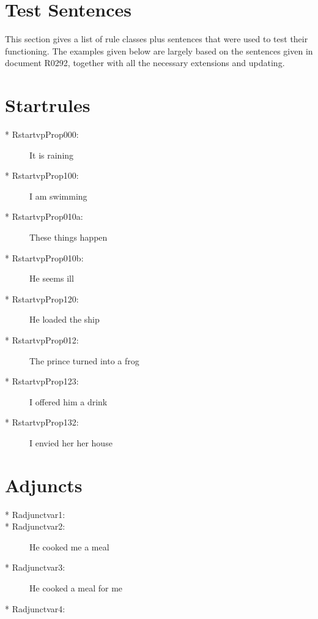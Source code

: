 \section {Test Sentences}
This section gives a list of rule classes plus sentences that were used to test 
their functioning. The examples given below are largely based on the sentences 
given in document R0292, together with all the necessary extensions and 
updating.


\section {Startrules}
\begin{description}
\item [* RstartvpProp000:] It is raining
\item [* RstartvpProp100:] I am swimming
\item [* RstartvpProp010a:] These things happen
\item [* RstartvpProp010b:] He seems ill
\item [* RstartvpProp120:] He loaded the ship
\item [* RstartvpProp012:] The prince turned into a frog
\item [* RstartvpProp123:] I offered him a drink
\item [* RstartvpProp132:] I envied her her house
\end{description}

\section {Adjuncts}
\begin{description}
\item[* Radjunctvar1:]\mbox{}
\item[* Radjunctvar2:] He cooked me a meal
\item[* Radjunctvar3:] He cooked a meal for me
\item[* Radjunctvar4:]\mbox{}
\end{description}

